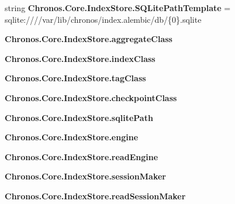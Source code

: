 \begin{DoxyCompactItemize}
\item 
string {\bfseries Chronos.\+Core.\+Index\+Store.\+S\+Q\+Lite\+Path\+Template} = \textquotesingle{}sqlite\+:////var/lib/chronos/index.\+alembic/db/\{0\}.sqlite\textquotesingle{}\hypertarget{group__Chronos_gadec294ed9eeb0e077c9e5ebaf6a998c0}{}\label{group__Chronos_gadec294ed9eeb0e077c9e5ebaf6a998c0}

\item 
{\bfseries Chronos.\+Core.\+Index\+Store.\+aggregate\+Class}\hypertarget{group__Chronos_ga3ea2eb1863511c1b44135f5d9bc20465}{}\label{group__Chronos_ga3ea2eb1863511c1b44135f5d9bc20465}

\item 
{\bfseries Chronos.\+Core.\+Index\+Store.\+index\+Class}\hypertarget{group__Chronos_gae52572b5b7e8ff292504964e99316c87}{}\label{group__Chronos_gae52572b5b7e8ff292504964e99316c87}

\item 
{\bfseries Chronos.\+Core.\+Index\+Store.\+tag\+Class}\hypertarget{group__Chronos_ga245371a936b284cca0a4a53e5dc6f696}{}\label{group__Chronos_ga245371a936b284cca0a4a53e5dc6f696}

\item 
{\bfseries Chronos.\+Core.\+Index\+Store.\+checkpoint\+Class}\hypertarget{group__Chronos_gabc7328a5734b8e3047a1a53cda0f41ce}{}\label{group__Chronos_gabc7328a5734b8e3047a1a53cda0f41ce}

\item 
{\bfseries Chronos.\+Core.\+Index\+Store.\+sqlite\+Path}\hypertarget{group__Chronos_gad477c7768e5bd1f80c9b5d1a5cff484e}{}\label{group__Chronos_gad477c7768e5bd1f80c9b5d1a5cff484e}

\item 
{\bfseries Chronos.\+Core.\+Index\+Store.\+engine}\hypertarget{group__Chronos_gad29ca671e4a0cacfe5042a0869518050}{}\label{group__Chronos_gad29ca671e4a0cacfe5042a0869518050}

\item 
{\bfseries Chronos.\+Core.\+Index\+Store.\+read\+Engine}\hypertarget{group__Chronos_ga95e7204acdf29be21ebd40bfcc075890}{}\label{group__Chronos_ga95e7204acdf29be21ebd40bfcc075890}

\item 
{\bfseries Chronos.\+Core.\+Index\+Store.\+session\+Maker}\hypertarget{group__Chronos_ga798d20ab91e8bf36e291729c4d8cf6c9}{}\label{group__Chronos_ga798d20ab91e8bf36e291729c4d8cf6c9}

\item 
{\bfseries Chronos.\+Core.\+Index\+Store.\+read\+Session\+Maker}\hypertarget{group__Chronos_ga0ffcf98b6d9389bec977d0566e538afb}{}\label{group__Chronos_ga0ffcf98b6d9389bec977d0566e538afb}


\end{DoxyCompactItemize}
